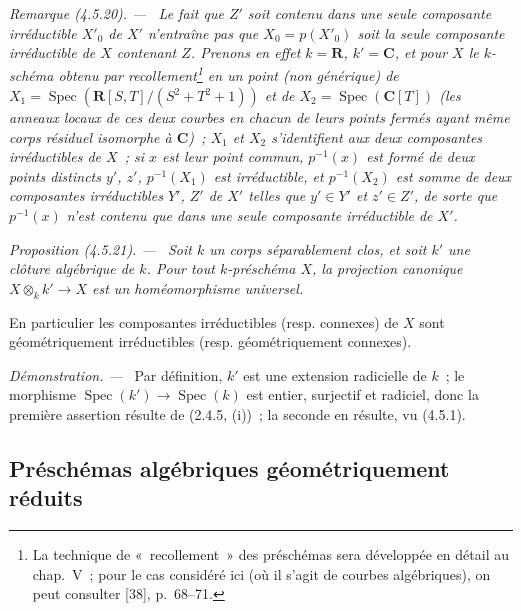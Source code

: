 \documentclass[10pt,oneside]{book}
\newcommand{\oldpage}[2][]{%
  \setcounter{footnote}{0}%
  \marginpar{\scriptsize\textbf{#1}~|~#2}\ignorespaces}
\newenvironment{proposition}[1][]{%
  \par\medskip\noindent\itshape Proposition (#1). ---\ }{\par}
\newenvironment{remark}[1][]{%
  \par\medskip\noindent\itshape Remarque (#1). ---\ }{\par}
\newenvironment{proof}{%
  \par\medskip\noindent\textit{Démonstration. ---\ }}{\par}
\begin{document}
\begin{remark}[4.5.20]
\label{IV.2.4.5.20-fr}
Le fait que $Z'$ soit contenu dans une seule composante irréductible $X'_0$ de
$X'$ \emph{n'entraîne pas} que $X_0=p(X'_0)$ soit la seule composante
irréductible de $X$ contenant $Z$. Prenons en effet $k=\mathbf R$,
$k'=\mathbf C$, et pour $X$ le $k$-schéma obtenu par recollement\footnote{La
technique de «~recollement~» des préschémas sera développée en détail au
chap.~V~; pour le cas considéré ici (où il s'agit de courbes algébriques), on
peut consulter [38], p.~68--71.} en un point (non générique) de
$X_1=\operatorname{Spec}(\mathbf R[S,T]/(S^2+T^2+1))$ et de
$X_2=\operatorname{Spec}(\mathbf C[T])$ (les anneaux locaux de ces deux courbes
en chacun de leurs points fermés ayant même corps résiduel isomorphe à
$\mathbf C$)~; $X_1$ et $X_2$ s'identifient aux deux composantes irréductibles
de $X$~; si $x$ est leur point commun, $p^{-1}(x)$ est formé de deux points
distincts $y'$, $z'$, $p^{-1}(X_1)$ est irréductible, et $p^{-1}(X_2)$ est somme
de deux composantes irréductibles $Y'$, $Z'$ de $X'$ telles que $y'\in Y'$ et
$z'\in Z'$, de sorte que $p^{-1}(x)$ n'est contenu que dans une seule
composante irréductible de $X'$.
\end{remark}

\begin{proposition}[4.5.21]
\label{IV.2.4.5.21-fr}
Soit $k$ un corps séparablement clos, et soit $k'$ une clôture algébrique de
$k$. Pour tout $k$-préschéma $X$, la projection canonique
$X\otimes_k k'\to X$ est un homéomorphisme universel.

\oldpage[IV-2]{68}

En particulier les composantes irréductibles (resp. connexes) de $X$ sont
géométriquement irréductibles (resp. géométriquement connexes).
\end{proposition}

\begin{proof}
Par définition, $k'$ est une extension radicielle de $k$~; le morphisme
$\operatorname{Spec}(k')\to\operatorname{Spec}(k)$ est entier, surjectif et
radiciel, donc la première assertion résulte de (2.4.5, (i))~; la seconde en
résulte, vu (4.5.1).
\end{proof}

\subsection{Préschémas algébriques géométriquement réduits}
\label{subsection:IV.2.4.6-fr}
\end{document}
